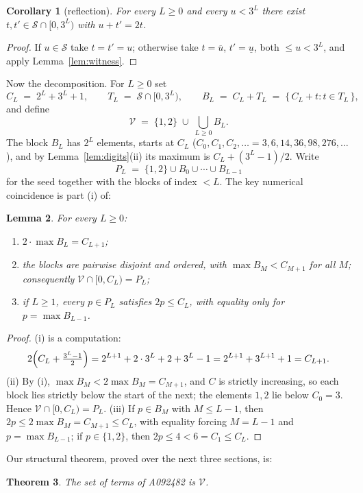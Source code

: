 \documentclass[12pt]{article}
\theoremstyle{plain}
\newtheorem{theorem}{Theorem}
\newtheorem{lemma}[theorem]{Lemma}
\newtheorem{corollary}[theorem]{Corollary}
\theoremstyle{definition}
\theoremstyle{remark}
\newcommand{\V}{\mathcal{V}}
\newcommand{\Sd}{\mathcal{S}}
\newcommand{\lo}[1]{\underline{#1}}
\newcommand{\hi}[1]{\overline{#1}}
\begin{document}
\begin{corollary}[reflection]\label{cor:reflect}
For every $L\geq 0$ and every $u<3^L$ there exist
$t,t'\in\Sd\cap[0,3^L)$ with $u+t'=2t$.
\end{corollary}

\begin{proof}
If $u\in\Sd$ take $t=t'=u$; otherwise take $t=\hi{u}$,
$t'=\lo{u}$, both $\leq u<3^L$, and apply
Lemma~\ref{lem:witness}.
\end{proof}

Now the decomposition.  For $L\geq 0$ set
\[
C_L \;=\; 2^L+3^L+1, \qquad
T_L \;=\; \Sd\cap[0,3^L), \qquad
B_L \;=\; C_L+T_L \;=\; \{\,C_L+t : t\in T_L\,\},
\]
and define
\[
\V \;=\; \{1,2\}\;\cup\;\bigcup_{L\geq 0} B_L .
\]
The block $B_L$ has $2^L$ elements, starts at $C_L$
($C_0,C_1,C_2,\ldots=3,6,14,36,98,276,\ldots$), and by
Lemma~\ref{lem:digits}(ii) its maximum is
$C_L+(3^L-1)/2$.  Write
\[
P_L \;=\; \{1,2\}\cup B_0\cup\cdots\cup B_{L-1}
\]
for the seed together with the blocks of index $<L$.  The key
numerical coincidence is part (i) of:

\begin{lemma}\label{lem:double}
For every $L\geq 0$:
\begin{enumerate}
\item[(i)] $2\cdot\max B_L = C_{L+1}$;
\item[(ii)] the blocks are pairwise disjoint and ordered, with
$\max B_M<C_{M+1}$ for all $M$; consequently
$\V\cap[0,C_L)=P_L$;
\item[(iii)] if $L\geq 1$, every $p\in P_L$ satisfies
$2p\leq C_L$, with equality only for $p=\max B_{L-1}$.
\end{enumerate}
\end{lemma}

\begin{proof}
(i) is a computation:
\[
2\Bigl(C_L+\tfrac{3^L-1}{2}\Bigr)
= 2^{L+1}+2\cdot 3^L+2+3^L-1
= 2^{L+1}+3^{L+1}+1
= C_{L+1}.
\]
(ii) By (i), $\max B_M<2\max B_M=C_{M+1}$, and $C$ is strictly
increasing, so each block lies strictly below the start of the
next; the elements $1,2$ lie below $C_0=3$.  Hence
$\V\cap[0,C_L)=P_L$.  (iii) If $p\in B_M$ with $M\leq L-1$, then
$2p\leq 2\max B_M=C_{M+1}\leq C_L$, with equality forcing
$M=L-1$ and $p=\max B_{L-1}$; if $p\in\{1,2\}$, then
$2p\leq 4<6=C_1\leq C_L$.
\end{proof}

Our structural theorem, proved over the next three sections, is:

\begin{theorem}\label{thm:blocks}
The set of terms of A092482 is $\V$.
\end{theorem}
\end{document}
